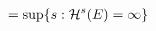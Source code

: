 \documentclass[preview]{standalone}
\begin{document}
\begin{align*}
= \sup\{ s : \mathcal{H}^s(E) = \infty \}  \hspace{2.65 cm}
\end{align*}
\end{document}
